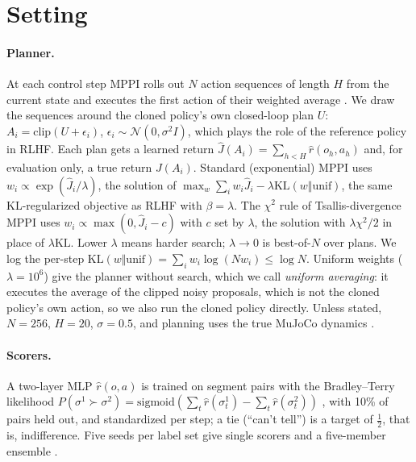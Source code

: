 \documentclass{article}
\theoremstyle{plain}
\theoremstyle{remark}
\newcommand{\KL}{\mathrm{KL}}
\newcommand{\Jh}{\hat{J}}
\begin{document}
\section{Setting}
\label{sec:setting}

\paragraph{Planner.} At each control step MPPI rolls out $N$ action sequences of length $H$ from the current state and
executes the first action of their weighted average \citep{williams2017mppi}. We draw the sequences around the cloned
policy's own closed-loop plan $U$: $A_i=\mathrm{clip}(U+\epsilon_i)$, $\epsilon_i\sim\mathcal N(0,\sigma^2I)$, which
plays the role of the reference policy in RLHF. Each plan gets a learned return $\Jh(A_i)=\sum_{h<H}\hat r(o_h,a_h)$
and, for evaluation only, a true return $J(A_i)$. Standard (exponential) MPPI uses
$w_i\propto\exp(\Jh_i/\lambda)$, the solution of $\max_w \sum_i w_i\Jh_i-\lambda\KL(w\Vert\mathrm{unif})$, the same
KL-regularized objective as RLHF with $\beta=\lambda$. The $\chi^2$ rule of Tsallis-divergence MPPI
\citep{wang2021tsallis} uses $w_i\propto\max(0,\Jh_i-c)$ with $c$ set by $\lambda$, the solution with $\lambda\chi^2/2$ in
place of $\lambda\KL$. Lower $\lambda$ means harder search; $\lambda\to0$ is best-of-$N$ over plans. We log the
per-step $\KL(w\Vert\mathrm{unif})=\sum_iw_i\log(Nw_i)\le\log N$. Uniform weights ($\lambda=10^6$) give the planner
without search, which we call \emph{uniform averaging}: it executes the average of the clipped noisy proposals, which
is not the cloned policy's own action, so we also run the cloned policy directly. Unless stated, $N=256$, $H=20$,
$\sigma=0.5$, and planning uses the true MuJoCo dynamics \citep{todorov2012mujoco}.

\paragraph{Scorers.} A two-layer MLP $\hat r(o,a)$ is trained on segment pairs with the Bradley--Terry likelihood
$P(\sigma^1\succ\sigma^2)=\mathrm{sigmoid}(\sum_t\hat r(\sigma^1_t)-\sum_t\hat r(\sigma^2_t))$
\citep{bradley1952rank,christiano2017deep}, with 10\% of pairs held out, and standardized per step; a tie (``can't
tell'') is a target of $\frac12$, that is, indifference. Five seeds per
label set give single scorers and a five-member ensemble \citep{lakshminarayanan2017ensembles}.
\end{document}
